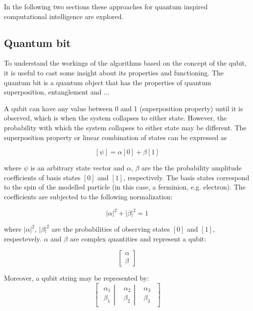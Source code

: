 In the following two sections these approaches for quantum inspired computational intelligence are explored.

\subsection{Quantum bit}

To understand the workings of the algorithms based on the concept of the qubit, it is useful to cast some insight about its properties and functioning.
The quantum bit is a quantum object that has the properties of quantum superposition, entanglement and ...


A qubit can have any value between 0 and 1 (superposition property) until it is observed, which is when the system collapses to either state. However, the probability with which the system collapses to either state  may be different. The superposition property or linear combination of states can be expressed as

$$
[\psi] = \alpha[0] + \beta[1]
$$

where $\psi$ is an arbitrary state vector and $\alpha$, $\beta$ are the the probability amplitude coefficients of basis states $[0]$ and $[1]$, respectively. The basis states correspond to the spin of the modelled particle (in this case, a ferminion, e.g. electron). The coefficients are subjected to the following normalization:

$$|\alpha|^2 + |\beta|^2 = 1$$

where $|\alpha|^2$, $|\beta|^2$ are the probabilities of observing states $[0]$ and $[1]$, respectevely. $\alpha$ and $\beta$ are complex quantities and represent a qubit:

$$\begin{bmatrix}
\alpha \\
\beta
\end{bmatrix}$$

Moreover, a qubit string may be represented by:
$$
\begin{bmatrix}
\left.\begin{matrix}
\alpha_1\\ 
\beta_1
\end{matrix}\right| & \left.\begin{matrix}
\alpha_2\\ 
\beta_2
\end{matrix}\right| & \begin{matrix}
\alpha_3\\ 
\beta_3
\end{matrix}
\end{bmatrix}
$$

